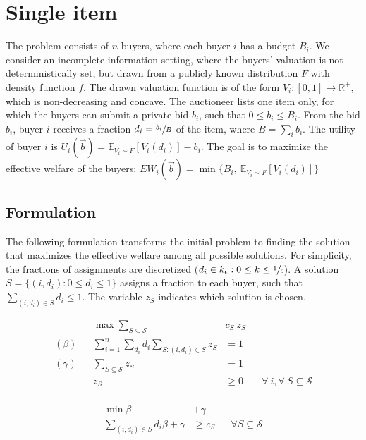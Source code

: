 
\section{Single item}

The problem consists of $n$ buyers, where each buyer $i$ has a budget $B_i$.
We consider an incomplete-information setting, where the buyers' valuation is not deterministically set, but drawn from a publicly known distribution $F$ with density function $f$. The drawn valuation function is of the form $V_i : [0,1] \rightarrow \mathbb{R}^+$, which is non-decreasing and concave. The auctioneer lists one item only, for which the buyers can submit a private bid $b_i$, such that $0 \le b_i \le B_i$. From the bid $b_i$, buyer $i$ receives a fraction $d_i = \sfrac{b_i}{B}$ of the item, where $B = \sum_i b_i$. The utility of buyer $i$ is $U_i(\vec{b}) = \mathbb{E}_{V_i \sim F}[V_i(d_i)] - b_i$. The goal is to maximize the effective welfare of the buyers: $EW_i(\vec{b}) = \min\{B_i,\  \mathbb{E}_{V_i \sim F}[V_i(d_i)]\}$

\subsection{Formulation}

The following formulation transforms the initial problem to finding the solution that maximizes the effective welfare among all possible solutions. For simplicity, the fractions of assignments are discretized ($d_i \in k_{\epsilon} : 0 \le k \le \sfrac{1}{\epsilon}$). A solution $S = \{(i, d_i) : 0 \le d_i \le 1\}$ assigns a fraction to each buyer, such that $\sum_{(i,d_{i}) \in S} d_{i} \le 1$. The variable $z_S$ indicates which solution is chosen.

\begin{minipage}[t]{0.59\textwidth}
	\begin{align*}
		&& \max  \sum_{S \subseteq \mathcal{S}} &c_{S}\ z_{S} \\
		(\beta) && \sum_{i=1}^{n} \sum_{d_{i}} d_{i} \sum_{S: (i,d_{i}) \in S } z_{S} &= 1 & & \\
		(\gamma) && \sum_{S \subseteq \mathcal{S}} z_{S}  &= 1	& & \\
		&& z_{S} &\geq 0 & & \forall\ i, \forall\ S \subseteq \mathcal{S}\\
	\end{align*}
\end{minipage}
\begin{minipage}[t]{0.3\textwidth}
	\begin{align*}
		\min \beta &+ \gamma \\
		\sum_{(i,d_{i}) \in S} d_{i} \beta + \gamma &\geq c_{S}  & & \forall S \subseteq \mathcal{S}\\
\end{align*}
\end{minipage}


